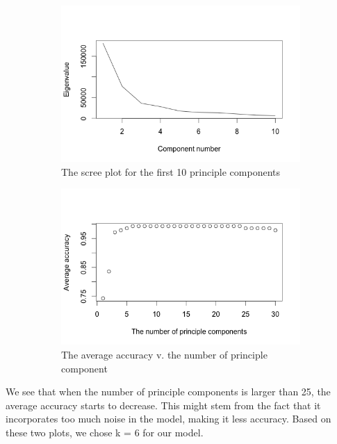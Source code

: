 \documentclass[12pt,onecolumn,letterpaper]{article}
\begin{document}
\begin{figure}[thbp]
  \centering
  \begin{subfigure}{.4\textwidth}
  \centering
    \includegraphics[width=\linewidth]{scree}
    \caption{The scree plot for the first 10 principle components}
    \label{fig:sub1}
  \end{subfigure}
  \begin{subfigure}{.4\textwidth}
    \centering
    \includegraphics[width=\linewidth]{acc_pc}
    \caption{The average accuracy v. the number of principle component}
    \label{fig:sub2}
  \end{subfigure}
  \caption{}
  \label{fig:2}
\end{figure}

We see that when the number of principle components is larger than 25, the average accuracy starts to decrease. This might stem from the fact that it incorporates too much noise in the model, making it less accuracy. Based on these two plots, we chose k = 6 for our model.  
\end{document}
